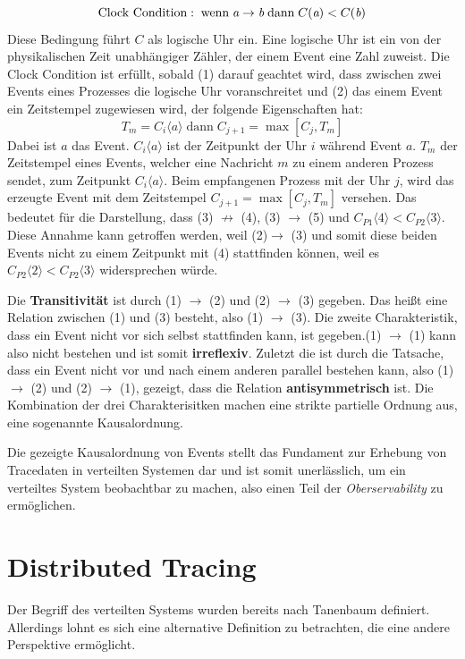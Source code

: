\[
\text{Clock Condition}: \; \text{wenn} \; \emph{a} \rightarrow \emph{b} \; \text{dann} \; C(\emph{a})<C(\emph{b})
\]
Diese Bedingung führt $C$ als logische Uhr ein. Eine logische Uhr ist ein von der physikalischen Zeit unabhängiger Zähler, der einem Event eine Zahl zuweist. Die Clock Condition ist erfüllt, sobald (1) darauf geachtet wird, dass zwischen zwei Events eines Prozesses die logische Uhr voranschreitet und (2) das einem Event ein Zeitstempel zugewiesen wird, der folgende Eigenschaften hat:
\[
 T_m = C_i \langle a \rangle \; 
 \text{dann} \; 
 {{C}_{j+1}} = \max[C_j,T_m]
\]
Dabei ist $a$ das Event. $C_i \langle a \rangle $ ist der Zeitpunkt der Uhr $i$ während Event $a$. $T_m$ der Zeitstempel eines Events, welcher eine Nachricht $m$ zu einem anderen Prozess sendet, zum Zeitpunkt $C_i \langle a \rangle$. Beim empfangenen Prozess mit der Uhr $j$, wird das erzeugte Event mit dem Zeitstempel ${{C}_{j+1}} = \max[C_j,T_m]$ versehen. Das bedeutet für die Darstellung, dass (3) $\not\rightarrow$ (4), (3) $\rightarrow$ (5) und $C_{P1} \langle 4 \rangle < C_{P2} \langle 3 \rangle$. Diese Annahme kann getroffen werden, weil (2)$\rightarrow$ (3) und somit diese beiden Events nicht zu einem Zeitpunkt mit (4) stattfinden können, weil es $C_{P2} \langle 2 \rangle < C_{P2} \langle 3 \rangle$ widersprechen würde.

 Die \textbf{Transitivität} ist durch (1) $\rightarrow$ (2) und (2) $\rightarrow$ (3) gegeben. Das heißt eine Relation zwischen (1) und (3) besteht, also (1) $\rightarrow$ (3). Die zweite Charakteristik, dass ein Event nicht vor sich selbst stattfinden kann, ist gegeben.(1) $\rightarrow$ (1) kann also nicht bestehen und ist somit \textbf{irreflexiv}. Zuletzt die ist durch die Tatsache, dass ein Event nicht vor und nach einem anderen parallel bestehen kann, also (1) $\rightarrow$ (2) und (2) $\rightarrow$ (1), gezeigt, dass die Relation \textbf{antisymmetrisch} ist. Die Kombination der drei Charakterisitken machen eine strikte partielle Ordnung aus, eine sogenannte Kausalordnung.

Die gezeigte Kausalordnung von Events stellt das Fundament zur Erhebung von Tracedaten in verteilten Systemen dar und ist somit unerlässlich, um ein verteiltes System beobachtbar zu machen, also einen Teil der \emph{Oberservability} zu ermöglichen.

\section{Distributed Tracing}
\label{subsection:Erkenntnisinteresse}
Der Begriff des verteilten Systems wurden bereits nach Tanenbaum definiert. Allerdings lohnt es sich eine alternative Definition zu betrachten, die eine andere Perspektive ermöglicht. 

